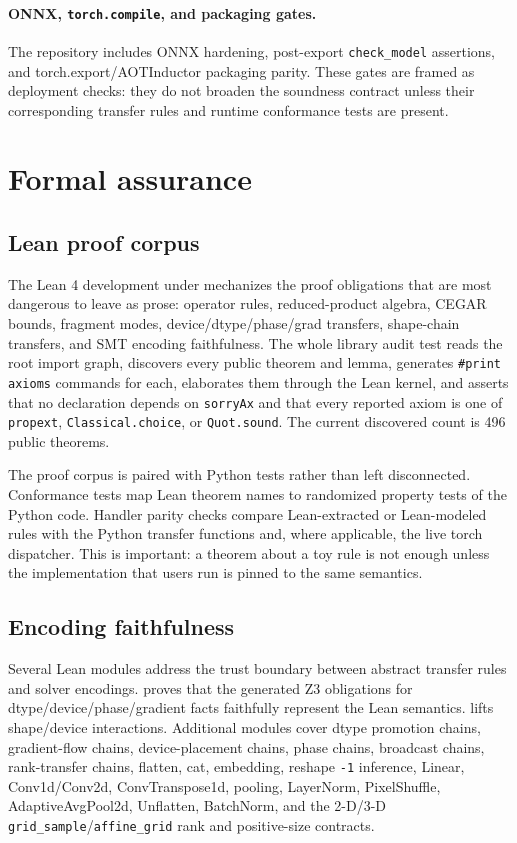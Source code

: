 \documentclass[11pt]{article}
\begin{document}
\paragraph{ONNX, \texttt{torch.compile}, and packaging gates.}
The repository includes ONNX hardening, post-export \texttt{check\_model}
assertions, and torch.export/AOTInductor packaging parity.  These gates are
framed as deployment checks: they do not broaden the soundness contract unless
their corresponding transfer rules and runtime conformance tests are present.

\section{Formal assurance}

\subsection{Lean proof corpus}

The Lean 4 development under  mechanizes the proof
obligations that are most dangerous to leave as prose: operator rules,
reduced-product algebra, CEGAR bounds, fragment modes, device/dtype/phase/grad
transfers, shape-chain transfers, and SMT encoding faithfulness.  The whole
library audit test reads the root import graph, discovers every public theorem
and lemma, generates \texttt{\#print axioms} commands for each, elaborates them
through the Lean kernel, and asserts that no declaration depends on
\texttt{sorryAx} and that every reported axiom is one of
\texttt{propext}, \texttt{Classical.choice}, or \texttt{Quot.sound}.  The
current discovered count is 496 public theorems.

The proof corpus is paired with Python tests rather than left disconnected.
Conformance tests map Lean theorem names to randomized property tests of the
Python code.  Handler parity checks compare Lean-extracted or Lean-modeled
rules with the Python transfer functions and, where applicable, the live torch
dispatcher.  This is important: a theorem about a toy rule is not enough unless
the implementation that users run is pinned to the same semantics.

\subsection{Encoding faithfulness}

Several Lean modules address the trust boundary between abstract transfer
rules and solver encodings.   proves that the generated
Z3 obligations for dtype/device/phase/gradient facts faithfully represent the
Lean semantics.   lifts shape/device interactions.
Additional modules cover dtype promotion chains, gradient-flow chains,
device-placement chains, phase chains, broadcast chains, rank-transfer chains,
flatten, cat, embedding, reshape \texttt{-1} inference, Linear, Conv1d/Conv2d,
ConvTranspose1d, pooling, LayerNorm, PixelShuffle, AdaptiveAvgPool2d,
Unflatten, BatchNorm, and the 2-D/3-D \texttt{grid\_sample}/\texttt{affine\_grid}
rank and positive-size contracts.
\end{document}
